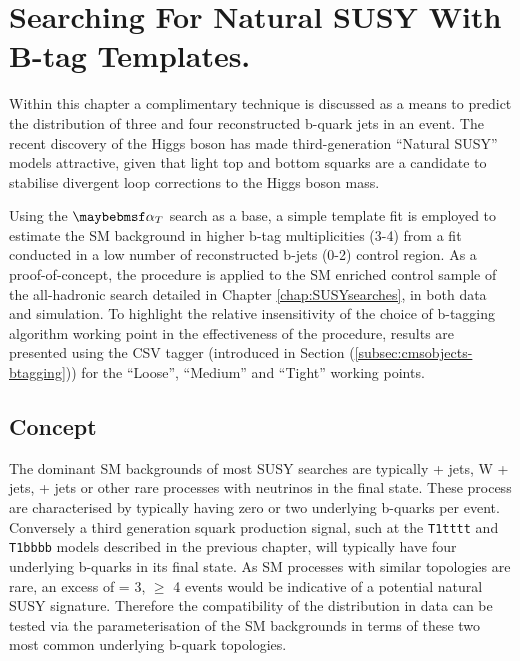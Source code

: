 \chapter{Searching For Natural SUSY With B-tag Templates.}
\label{chap:templatemethod}


Within this chapter a complimentary technique is discussed as a means to predict the distribution of three and four reconstructed b-quark jets in an event. The recent discovery of the Higgs boson has made third-generation ``Natural \ac{SUSY}'' models attractive, given that light top and bottom squarks are a candidate to stabilise divergent loop corrections to the Higgs boson mass.

Using the $\alphat$ search as a base, a simple template fit is employed to estimate the \ac{SM} background in higher b-tag multiplicities (3-4) from a fit conducted in a low number of reconstructed b-jets (0-2) control region. As a proof-of-concept, the procedure is applied to the SM enriched \mupjets control sample of the \alphat all-hadronic search detailed in Chapter \ref{chap:SUSYsearches}, in both data and simulation. To highlight the relative insensitivity of the choice of b-tagging algorithm working point in the effectiveness of the procedure, results are presented using the \ac{CSV} tagger (introduced in Section (\ref{subsec:cmsobjects-btagging})) for the ``Loose'', ``Medium'' and ``Tight'' working points.

\section{Concept}
\label{sec:templateconcept}

The dominant \ac{SM} backgrounds of most \ac{SUSY} searches are typically \ttbar + jets, W + jets, \zinv + jets or other rare processes with neutrinos in the final state. These process are characterised by typically having zero or two underlying b-quarks per event. Conversely a third generation squark production signal, such at the \texttt{T1tttt} and \texttt{T1bbbb} models described in the previous chapter, will typically have four underlying b-quarks in its final state.  As \ac{SM} processes with similar topologies are rare, an excess of \nbreco = 3, $\geq$ 4 events would be indicative of a potential natural \ac{SUSY} signature. Therefore the compatibility of the \nbreco distribution in data can be tested via the parameterisation of the \ac{SM} backgrounds in terms of these two most common underlying b-quark topologies. 

